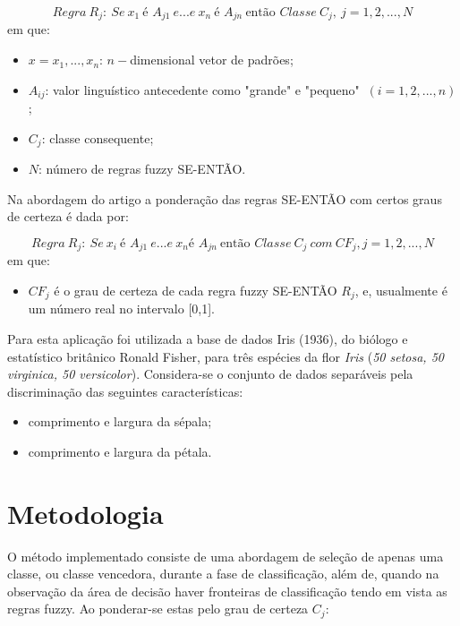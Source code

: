 \documentclass[12pt,a4paper]{article}
\numberwithin{equation}{section}
\begin{document}
\begin{equation} \label{eq1}
Regra~R_{j}:~Se~x_{1}~ \text{é }A_{j1}~e... e~x_{n}~\text{é }A_{jn}~\text{então } Classe~C_{j},~j=1,2,...,N
\end{equation}
em que:
\begin{itemize}
\item $x={x_{1},...,x_{n}}$: $n-$dimensional vetor de padrões;
\item $A_{ij}$: valor linguístico antecedente como "grande" e "pequeno" $~(i=1,2,...,n)$;
\item $C_{j}$: classe consequente;
\item $N$: número de regras fuzzy SE-ENTÃO.
\end{itemize}

Na abordagem do artigo a ponderação das regras SE-ENTÃO com certos graus de certeza é dada por:

\begin{equation} \label{eq2}
Regra~R_{j}:~Se~x_{i}~\text{é } A_{j1}~e...e~x_{n} \text{é } A_{jn}~\text{então }Classe~C_{j}~com~CF_{j}, j=1,2,...,N
\end{equation}
em que:
\begin{itemize} 
\item $CF_{j}$ é o grau de certeza de cada regra fuzzy SE-ENTÃO $R_{j}$, e, usualmente é um número real no intervalo [0,1].
\end{itemize}

Para esta aplicação foi utilizada a base de dados Iris (1936), do biólogo e estatístico britânico Ronald Fisher, para três espécies da flor \textit{Iris} (\textit{50 setosa, 50 virginica, 50 versicolor}). Considera-se o conjunto de dados separáveis pela discriminação das seguintes características:

\begin{itemize}
\item comprimento e largura da sépala;
\item comprimento e largura da pétala.
\end{itemize}

\section{Metodologia}

O método implementado consiste de uma abordagem de seleção de apenas uma classe, ou classe vencedora, durante a fase de classificação, além de, quando na observação da área de decisão haver fronteiras de classificação tendo em vista as regras fuzzy. Ao ponderar-se estas pelo grau de certeza $C_{j}$:
\end{document}
